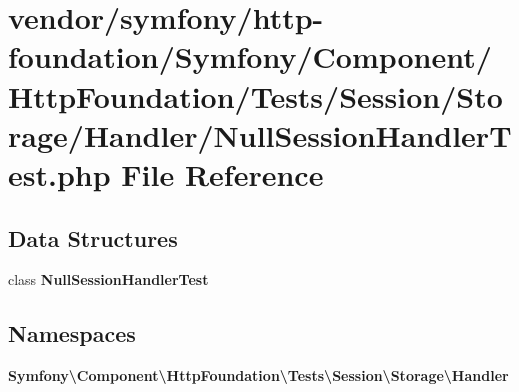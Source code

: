 \section{vendor/symfony/http-\/foundation/\+Symfony/\+Component/\+Http\+Foundation/\+Tests/\+Session/\+Storage/\+Handler/\+Null\+Session\+Handler\+Test.php File Reference}
\label{_null_session_handler_test_8php}
\subsection*{Data Structures}
\begin{DoxyCompactItemize}
\item 
class {\bf Null\+Session\+Handler\+Test}
\end{DoxyCompactItemize}
\subsection*{Namespaces}
\begin{DoxyCompactItemize}
\item 
 {\bf Symfony\textbackslash{}\+Component\textbackslash{}\+Http\+Foundation\textbackslash{}\+Tests\textbackslash{}\+Session\textbackslash{}\+Storage\textbackslash{}\+Handler}
\end{DoxyCompactItemize}
